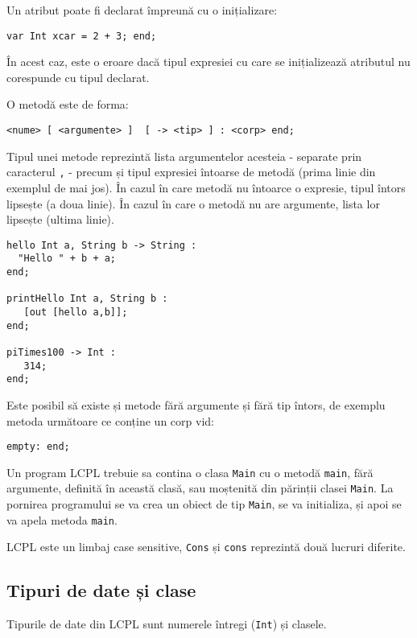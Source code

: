 \documentclass[12pt]{article}
\begin{document}
Un atribut poate fi declarat împreună cu o inițializare:

\begin{verbatim}
var Int xcar = 2 + 3; end;
\end{verbatim}

În acest caz, este o eroare dacă tipul expresiei cu care se inițializează atributul nu corespunde cu tipul declarat.

O metodă este de forma:

\begin{verbatim}
<nume> [ <argumente> ]  [ -> <tip> ] : <corp> end;
\end{verbatim}

Tipul unei metode reprezintă lista argumentelor acesteia - separate prin caracterul \texttt{,} - precum și tipul expresiei întoarse de metodă (prima linie din exemplul de mai jos). În cazul în care metodă nu întoarce o expresie, tipul întors lipsește (a doua linie). În cazul în care o metodă nu are argumente, lista lor lipsește (ultima linie).

\begin{verbatim}
hello Int a, String b -> String : 
  "Hello " + b + a; 
end;

printHello Int a, String b :
   [out [hello a,b]];
end;

piTimes100 -> Int :
   314;
end;
\end{verbatim}

Este posibil să existe și metode fără argumente și fără tip întors, de exemplu metoda următoare ce conține un corp vid:

\begin{verbatim}
empty: end;
\end{verbatim}

Un program LCPL trebuie sa contina o clasa \texttt{Main} cu o metodă \texttt{main}, fără argumente, definită în această clasă, sau moștenită din părinții clasei \texttt{Main}. La pornirea programului se va crea un obiect de tip \texttt{Main}, se va initializa, și apoi se va apela metoda \texttt{main}.

LCPL este un limbaj case sensitive, \texttt{Cons} și \texttt{cons} reprezintă două lucruri diferite.

\subsection{Tipuri de date și clase}

Tipurile de date din LCPL sunt numerele întregi (\texttt{Int}) și clasele.
\end{document}
